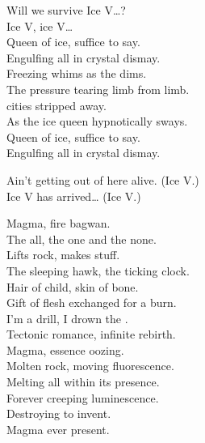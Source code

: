 Will we survive Ice V…? \\

Ice V, ice V… \\

Queen of ice, suffice to say. \\
Engulfing all in crystal dismay. \\
Freezing whims as the  dims. \\
The pressure tearing limb from limb. \\

 cities stripped away. \\
As the ice queen hypnotically sways. \\
Queen of ice, suffice to say. \\
Engulfing all in crystal dismay. \\


Ain't getting out of here alive. (Ice V.) \\
Ice V has arrived… (Ice V.) \\





Magma, fire bagwan. \\
The all, the one and the none. \\
Lifts rock, makes stuff. \\
The sleeping hawk, the ticking clock. \\

Hair of child, skin of bone. \\
Gift of flesh exchanged for a burn. \\
I'm a drill, I drown the . \\
Tectonic romance, infinite rebirth. \\

Magma, essence oozing. \\
Molten rock, moving fluorescence. \\
Melting all within its presence. \\
Forever creeping luminescence. \\
Destroying to invent. \\
Magma  ever present. \\

